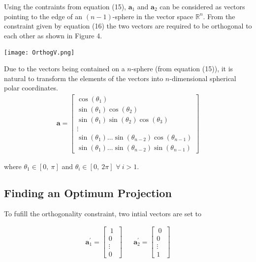 \documentclass[a4paper,11pt,twoside]{article}
\begin{document}
Using the contraints from equation (15), $\bm{a}_1$ and $\bm{a}_2$ can be considered as vectors pointing to the edge of an $(n-1)$-sphere in the vector space $\mathbb{R}^n$. From the constraint given by equation (16) the two vectors are required to be orthogonal to each other as shown in Figure 4. 
\begin{center}
\texttt{[image: OrthogV.png]}

\end{center}

Due to the vectors being contained on a $n$-sphere (from equation (15)), it is natural to transform the elements of the vectors into $n$-dimensional spherical polar coordinates. 
\begin{align}
\bm{a} = \begin{bmatrix}
           \cos(\theta_1) \\
           \sin(\theta_1)\cos(\theta_2) \\
           \sin(\theta_1)\sin(\theta_2)\cos(\theta_3) \\
           \vdots \\
		   \sin(\theta_1) \dotsc \sin(\theta_{n-2})\cos(\theta_{n-1}) \\
           \sin(\theta_1) \dotsc \sin(\theta_{n-2})\sin(\theta_{n-1})
           \end{bmatrix}
\end{align}

where $\theta_1 \in [0,\ \pi]$ and $\theta_i \in [0,\ 2\pi]$ $\forall \ i > 1$. 

\subsection{Finding an Optimum Projection}

To fufill the orthogonality constraint, two intial vectors are set to

\begin{align}
\bm{a}_1^{\prime} = \begin{bmatrix}
           \ 1 \ \\
           0 \\
           \vdots \\
           0
           \end{bmatrix} 
           && 
\bm{a}_2^{\prime} = \begin{bmatrix}
           \ 0 \ \\
           0 \\
           \vdots \\
           1
           \end{bmatrix} 
\end{align}
\end{document}
